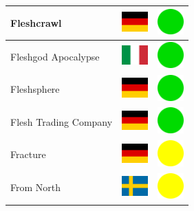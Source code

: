 \documentclass[12pt, a4paper, twoside]{report}
\begin{document}
\begin{center}
\begin{longtable}{|p{5cm}|p{2cm}|p{2cm}|}
Fleshcrawl & \includegraphics[width=1cm]{4x3/de} & \includegraphics[width=1cm]{likes/y} \\ \hline
Fleshgod Apocalypse & \includegraphics[width=1cm]{4x3/it} & \includegraphics[width=1cm]{likes/y} \\ \hline
Fleshsphere & \includegraphics[width=1cm]{4x3/de} & \includegraphics[width=1cm]{likes/y} \\ \hline
Flesh Trading Company & \includegraphics[width=1cm]{4x3/de} & \includegraphics[width=1cm]{likes/y} \\ \hline
Fracture & \includegraphics[width=1cm]{4x3/de} & \includegraphics[width=1cm]{likes/m} \\ \hline
From North & \includegraphics[width=1cm]{4x3/se} & \includegraphics[width=1cm]{likes/m} \\ \hline

\end{longtable}
\end{center}
\end{document}
